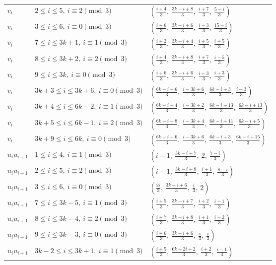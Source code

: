 \begin{longtable}{lll}
$v_i$ & $2 \le i \le 5,\ i \equiv 2 \pmod{3}$ & $(\frac{i+4}{3},\ \frac{3k-i+8}{3},\ \frac{i+7}{3},\ \frac{5-i}{3})$ \\
$v_i$ & $3 \le i \le 6,\ i \equiv 0 \pmod{3}$ & $(\frac{i+6}{3},\ \frac{3k-i+6}{3},\ \frac{i-3}{3},\ \frac{15-i}{3})$ \\
$v_i$ & $7 \le i \le 3k+1,\ i \equiv 1 \pmod{3}$ & $(\frac{i+2}{3},\ \frac{3k-i+4}{3},\ \frac{i+5}{3},\ \frac{i+5}{3})$ \\
$v_i$ & $8 \le i \le 3k+2,\ i \equiv 2 \pmod{3}$ & $(\frac{i+4}{3},\ \frac{3k-i+8}{3},\ \frac{i+7}{3},\ \frac{i-5}{3})$ \\
$v_i$ & $9 \le i \le 3k,\ i \equiv 0 \pmod{3}$ & $(\frac{i+6}{3},\ \frac{3k-i+6}{3},\ \frac{i-3}{3},\ \frac{i+3}{3})$ \\
$v_i$ & $3k+3 \le i \le 3k+6,\ i \equiv 0 \pmod{3}$ & $(\frac{6k-i+6}{3},\ \frac{i-3k+6}{3},\ \frac{6k-i+3}{3},\ \frac{i+3}{3})$ \\
$v_i$ & $3k+4 \le i \le 6k-2,\ i \equiv 1 \pmod{3}$ & $(\frac{6k-i+4}{3},\ \frac{i-3k+2}{3},\ \frac{6k-i+13}{3},\ \frac{6k-i+13}{3})$ \\
$v_i$ & $3k+5 \le i \le 6k-1,\ i \equiv 2 \pmod{3}$ & $(\frac{6k-i+8}{3},\ \frac{i-3k+4}{3},\ \frac{6k-i+11}{3},\ \frac{6k-i+5}{3})$ \\
$v_i$ & $3k+9 \le i \le 6k,\ i \equiv 0 \pmod{3}$ & $(\frac{6k-i+6}{3},\ \frac{i-3k+6}{3},\ \frac{6k-i+3}{3},\ \frac{6k-i+15}{3})$ \\
$u_i u_{i+1}$ & $1 \le i \le 4,\ i \equiv 1 \pmod{3}$ & $(i-1,\ \frac{3k-i+7}{3},\ 2,\ \frac{7-i}{3})$ \\
$u_i u_{i+1}$ & $2 \le i \le 5,\ i \equiv 2 \pmod{3}$ & $(i-1,\ \frac{3k-i+8}{3},\ \frac{i+1}{3},\ \frac{8-i}{3})$ \\
$u_i u_{i+1}$ & $3 \le i \le 6,\ i \equiv 0 \pmod{3}$ & $(\frac{2i}{3},\ \frac{3k-i+6}{3},\ \frac{i}{3},\ 2)$ \\
$u_i u_{i+1}$ & $7 \le i \le 3k-5,\ i \equiv 1 \pmod{3}$ & $(\frac{i+5}{3},\ \frac{3k-i+7}{3},\ \frac{i+2}{3},\ \frac{i-1}{3})$ \\
$u_i u_{i+1}$ & $8 \le i \le 3k-4,\ i \equiv 2 \pmod{3}$ & $(\frac{i+7}{3},\ \frac{3k-i+8}{3},\ \frac{i+1}{3},\ \frac{i-2}{3})$ \\
$u_i u_{i+1}$ & $9 \le i \le 3k-3,\ i \equiv 0 \pmod{3}$ & $(\frac{i+6}{3},\ \frac{3k-i+6}{3},\ \frac{i}{3},\ \frac{i}{3})$ \\
$u_i u_{i+1}$ & $3k-2 \le i \le 3k+1,\ i \equiv 1 \pmod{3}$ & $(\frac{i+5}{3},\ \frac{6k-2i+2}{3},\ \frac{i+2}{3},\ \frac{i-1}{3})$ \\

\end{longtable}
